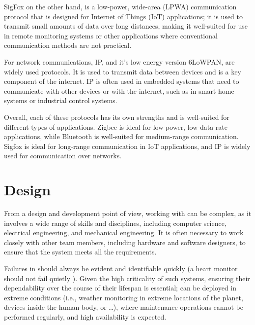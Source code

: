SigFox on the other hand, is a low-power, wide-area (LPWA) communication protocol that is designed for Internet of Things (IoT) applications; it is used to transmit small amounts of data over long distances, making it well-suited for use in remote monitoring systems or other applications where conventional communication methods are not practical.

For network communications, IP, and it's low energy version 6LoWPAN, are widely used protocols. It is used to transmit data between devices and is a key component of the internet. IP is often used in embedded systems that need to communicate with other devices or with the internet, such as in smart home systems or industrial control systems.

Overall, each of these protocols has its own strengths and is well-suited for different types of applications. Zigbee is ideal for low-power, low-data-rate applications, while Bluetooth is well-suited for medium-range communication. Sigfox is ideal for long-range communication in IoT applications, and IP is widely used for communication over networks.



\section{Design}
From a design and development point of view, working with \ess can be complex, as it involves a wide range of skills and disciplines, including computer science, electrical engineering, and mechanical engineering. It is often necessary to work closely with other team members, including hardware and software designers, to ensure that the system meets all the requirements.

Failures in \ess should always be evident and identifiable quickly (a heart monitor should not fail quietly \cite{MakingEmbeddedSystems}). Given the high criticality of such systems, ensuring their dependability over the course of their lifespan is essential; \ess can be deployed in extreme conditions (i.e., weather monitoring in extreme locations of the planet, devices inside the human body, or \dots), where maintenance operations cannot be performed regularly,  and high availability is expected. 

